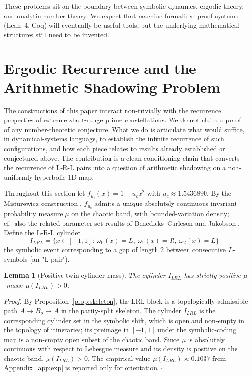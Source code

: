 \documentclass[cupthm,crop,info]{CUP-JNL-ETS}
\theoremstyle{cupplain}
\newtheorem{lemma}[theorem]{Lemma}
\theoremstyle{cupdefinition}
\theoremstyle{cupremark}
\providecommand{\qed}{\hfill\(\square\)}
\newenvironment{proof}{\par\noindent\textit{Proof.}\quad}{\qed\par\medskip}
\numberwithin{equation}{section}
\begin{document}
These problems sit on the boundary between symbolic dynamics, ergodic
theory, and analytic number theory. We expect that machine-formalised
proof systems (Lean~4, Coq) will eventually be useful tools, but the
underlying mathematical structures still need to be invented.

\section{Ergodic Recurrence and the Arithmetic Shadowing Problem}
\label{sec:twin-pathway}

The constructions of this paper interact non-trivially with the
recurrence properties of extreme short-range prime constellations.
We do not claim a proof of any number-theoretic conjecture. What we
do is articulate what would suffice, in dynamical-systems language,
to establish the infinite recurrence of such configurations, and how
each piece relates to results already established or conjectured
above. The contribution is a clean conditioning chain that converts
the recurrence of L-R-L pairs into a question of arithmetic
shadowing on a non-uniformly hyperbolic 1D map.

Throughout this section let $f_{u_c}(x) = 1 - u_c x^2$ with
$u_c \approx 1.5436890$. By the Misiurewicz construction
\cite{misiurewicz1981absolutely}, $f_{u_c}$ admits a unique absolutely
continuous invariant probability measure $\mu$ on the chaotic band,
with bounded-variation density; cf.\ also the related parameter-set
results of Benedicks--Carleson \cite{benedicks1985dynamics} and
Jakobson \cite{jakobson1981absolutely}. Define the L-R-L cylinder
\[
    I_{LRL} = \{ x \in [-1, 1] :\
        \omega_0(x) = L,\ \omega_1(x) = R,\ \omega_2(x) = L \},
\]
the symbolic event corresponding to a gap of length $2$ between
consecutive $L$-symbols (an "L-pair").

\begin{lemma}[Positive twin-cylinder mass]
\label{lem:positive-mass}
The cylinder $I_{LRL}$ has strictly positive $\mu$-mass:
$\mu(I_{LRL}) > 0$.
\end{lemma}
\begin{proof}
By Proposition~\ref{prop:skeleton}, the LRL block is a topologically
admissible path $A \to B_o \to A$ in the parity-split skeleton. The
cylinder $I_{LRL}$ is the corresponding cylinder set in the symbolic
shift, which is open and non-empty in the topology of itineraries; its
preimage in $[-1, 1]$ under the symbolic-coding map is a non-empty
open subset of the chaotic band. Since $\mu$ is absolutely continuous
with respect to Lebesgue measure
\cite{misiurewicz1981absolutely,jakobson1981absolutely} and its density
is positive on the chaotic band, $\mu(I_{LRL}) > 0$. The empirical
value $\mu(I_{LRL}) \approx 0.1037$ from
Appendix~\ref{app:exp} is reported only for orientation.
\end{proof}
\end{document}
